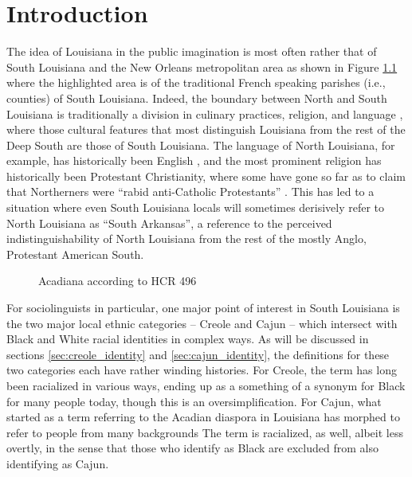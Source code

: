 \chapter{Introduction}
  The idea of Louisiana in the public imagination is most often rather that of South Louisiana and the New Orleans metropolitan area as shown in Figure \ref{fig:mapacadiana} where the highlighted area is of the traditional French speaking parishes (i.e., counties) of South Louisiana.
  Indeed, the boundary between North and South Louisiana is traditionally a division in culinary practices, religion, and language \parencite[p.~309]{trepanier_french_1988}, where those cultural features that most distinguish Louisiana from the rest of the Deep South are those of South Louisiana.
  The language of North Louisiana, for example, has historically been English \parencite[p.~265]{gold_french_1979}, and the most prominent religion has historically been Protestant Christianity, where some have gone so far as to claim that Northerners were ``rabid anti-Catholic Protestants'' \parencite[p.~27]{johnson_louisiana_1976}.
  This has led to a situation where even South Louisiana locals will sometimes derisively refer to North Louisiana as ``South Arkansas'', a reference to the perceived indistinguishability of North Louisiana from the rest of the mostly Anglo, Protestant American South.

  \begin{figure}[tbhp]
    \caption{Acadiana according to HCR 496 \parencite[1971, as cited in][]{trepanier_french_1988}}
    \label{fig:mapacadiana}
  \end{figure}

  For sociolinguists in particular, one major point of interest in South Louisiana is the two major local ethnic categories -- Creole and Cajun -- which intersect with Black and White racial identities in complex ways.
  As will be discussed in sections \ref{sec:creole_identity} and \ref{sec:cajun_identity}, the definitions for these two categories each have rather winding histories.
  For Creole, the term has long been racialized in various ways, ending up as a something of a synonym for Black for many people today, though this is an oversimplification.
  For Cajun, what started as a term referring to the Acadian diaspora in Louisiana has morphed to refer to people from many backgrounds
  The term is  racialized, as well, albeit less overtly, in the sense that those who identify as Black are excluded from also identifying as Cajun.
  
